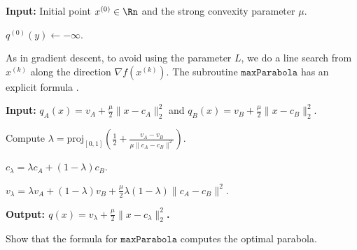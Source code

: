\begin{algorithm2e}[H]

\caption{$\mathtt{ParabolaMethod}$}

\SetAlgoLined

\textbf{Input:} Initial point $x^{(0)}\in\Rn$ and the strong convexity
parameter $\mu$.

$q^{(0)}(y)\leftarrow-\infty$.


\end{algorithm2e}

As in gradient descent, to avoid using the parameter $L$, we do a
line search from $x^{(k)}$ along the direction $\nabla f(x^{(k)})$.
 The subroutine $\mathtt{maxParabola}$ has an explicit formula \cite{drusvyatskiy2016optimal}.

\begin{algorithm2e}[H]

\caption{$q=\mathtt{maxParabola}(\max(q_{a},q_{b}))$}

\SetAlgoLined

\textbf{Input:} $q_{A}(x)=v_{A}+\frac{\mu}{2}\|x-c_{A}\|_{2}^{2}$
and $q_{B}(x)=v_{B}+\frac{\mu}{2}\|x-c_{B}\|_{2}^{2}$.

Compute $\lambda=\mathrm{proj}_{[0,1]}\left(\frac{1}{2}+\frac{v_{A}-v_{B}}{\mu\|c_{A}-c_{B}\|^{2}}\right)$.

$c_{\lambda}=\lambda c_{A}+(1-\lambda)c_{B}$.

$v_{\lambda}=\lambda v_{A}+(1-\lambda)v_{B}+\frac{\mu}{2}\lambda(1-\lambda)\|c_{A}-c_{B}\|^{2}$.

\textbf{Output: $q(x)=v_{\lambda}+\frac{\mu}{2}\|x-c_{\lambda}\|_{2}^{2}$.}

\end{algorithm2e}
\begin{xca}
Show that the formula for $\mathtt{maxParabola}$ computes the optimal
parabola.
\end{xca}

